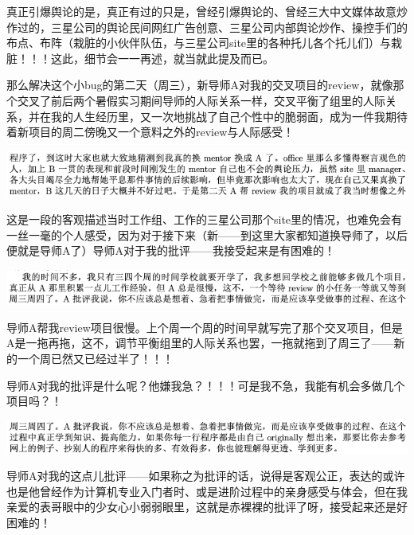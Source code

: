 \documentclass[9pt, b5paper]{article}
\begin{document}
真正引爆舆论的是，真正有过的只是，曾经引爆舆论的、曾经三大中文媒体故意炒作过的，三星公司的舆论民间网红广告创意、三星公司内部舆论炒作、操控手们的布点、布阵（栽脏的小伙伴队伍，与三星公司site里的各种托儿各个托儿们）与栽脏！！！这此，细节会一一再述，就当就此提及而已。

那么解决这个小bug的第二天（周三），新导师A对我的交叉项目的review，就像那个交叉了前后两个暑假实习期间导师的人际关系一样，交叉平衡了组里的人际关系，并在我的人生经历里，又一次地挑战了自己个性中的脆弱面，成为一件我期待着新项目的周二傍晚又一个意料之外的review与人际感受！

\begin{center}
\includegraphics[width=.9\linewidth]{./pic/backups_plans_20210511_124702.png}
\end{center}

这是一段的客观描述当时工作组、工作的三星公司那个site里的情况，也难免会有一丝一毫的个人感受，因为对于接下来（新——到这里大家都知道换导师了，以后便就是导师A了）导师A对于我的批评——我接受起来是有困难的！

\begin{center}
\includegraphics[width=.9\linewidth]{./pic/backups_plans_20210511_125033.png}
\end{center}

导师A帮我review项目很慢。上个周一个周的时间早就写完了那个交叉项目，但是A是一拖再拖，这不，调节平衡组里的人际关系也罢，一拖就拖到了周三了——新的一个周已然又已经过半了！！！

导师A对我的批评是什么呢？他嫌我急？！！！可是我不急，我能有机会多做几个项目吗？！

\begin{center}
\includegraphics[width=.9\linewidth]{./pic/backups_plans_20210511_125118.png}
\end{center}

导师A对我的这点儿批评——如果称之为批评的话，说得是客观公正，表达的或许也是他曾经作为计算机专业入门者时、或是进阶过程中的亲身感受与体会，但在我亲爱的表哥眼中的少女心小弱弱眼里，这就是赤裸裸的批评了呀，接受起来还是好困难的！
\end{document}
